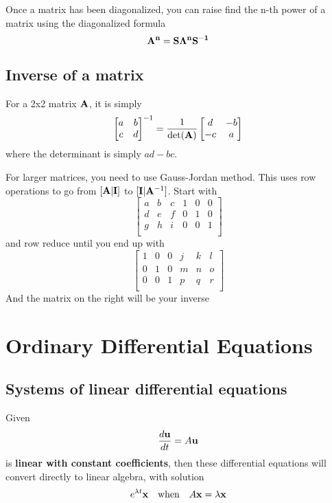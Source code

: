 \documentclass{article}
\begin{document}
Once a matrix has been diagonalized, you can raise find the n-th power of a matrix using the diagonalized formula
$$
\vb{A^n} = \vb{S}\vb{\Lambda^n}{\vb{S^{-1}}}
$$

\subsection{Inverse of a matrix}
For a 2x2 matrix $\vb{A}$, it is simply
$$
\begin{bmatrix}
	a & b \\
	c & d 
\end{bmatrix}^{-1}
= 
\frac{1}{\det(\vb{A})}
\begin{bmatrix}
	d  & -b \\
	-c & a  
\end{bmatrix}
$$
where the determinant is simply $ad-bc$. 

For larger matrices, you need to use Gauss-Jordan method.  This uses row operations to go from $[\vb{A} | \vb{I}]$ to $[\vb{I} | \vb{A}^{-1}]$. Start with
$$
\begin{bmatrix}
	a & b & c & 1 & 0 & 0 \\
	d & e & f & 0 & 1 & 0 \\
	g & h & i & 0 & 0 & 1 \\
\end{bmatrix}
$$
and row reduce until you end up with 
$$
\begin{bmatrix}
	1 & 0 & 0 & j & k & l \\
	0 & 1 & 0 & m & n & o \\
	0 & 0 & 1 & p & q & r \\
\end{bmatrix}
$$
And the matrix on the right will be your inverse
\section{Ordinary Differential Equations}
\subsection{Systems of linear differential equations}
Given 
$$
\frac{d\vb{u}}{dt} = A \vb{u}
$$
is \textbf{linear with constant coefficients}, then these differential equations will convert directly to linear algebra, with solution 
$$
e^{\lambda t} \vb{x} \quad \text{when} \quad A\vb{x} = \lambda \vb{x}
$$
\end{document}
